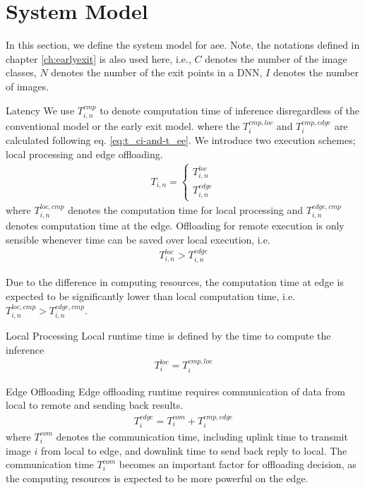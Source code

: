 \section{System Model} \label{sec:edge-system-model}
In this section, we define the system model for \gls{aee}. Note, the notations defined in chapter \ref{ch:earlyexit} is also used here, i.e., $ C $ denotes the number of the image classes, $ N $ denotes the number of the exit points in a DNN, $ I $ denotes the number of images. 	
\begin{enumdescript}
	\item[Latency]  We use $ T_{i,n}^{cmp} $ to denote computation time of inference disregardless of the conventional model or the early exit model. 
	where the $ T_i^{cmp,loc} $ and $ T_i^{cmp,edge} $ are calculated following eq. \ref{eq:t_ci-and-t_ee}.
	We introduce two execution schemes; local processing and edge offloading.
	\begin{align}
	T_{i,n} = \begin{cases}
	T_{i,n}^{loc} \\
	T_{i,n}^{edge}
	\end{cases}
	\end{align}
	where $ T_{i,n}^{loc,cmp} $ denotes the computation time for local processing  and $ T_{i,n}^{edge,cmp} $ denotes computation time at the edge. 
	Offloading for remote execution is only sensible whenever time can be saved over local execution, i.e.
	\begin{align*}
	T_{i,n}^{loc} > T_{i,n}^{edge}
	\end{align*}
	
	
	Due to the difference in computing resources, the computation time at edge is expected to be significantly lower than local computation time, i.e. $ T_{i,n}^{loc,cmp} > T_{i,n}^{edge,cmp} $. 
	
	
	\begin{enumdescript}
		\item[Local Processing] Local runtime time is defined by the time to compute the inference
		\begin{align}
		T_{i}^{loc}= T_{i}^{cmp,loc}
		\end{align}
		\item[Edge Offloading] Edge offloading runtime requires communication of data from local to remote and sending back results.
		\begin{align}
		T_{i}^{edge}=T_{i}^{com}+ T_{i}^{cmp,edge}
		\end{align}
		where $ T^{com}_i $ denotes the communication time, including uplink time to transmit image $ i $ from local to edge, and downlink time to send back reply to local. The communication time $ T^{com}_i $ becomes an important factor for offloading decision, as the computing resources is expected to be more powerful on the edge.			
		

\end{enumdescript}
\end{enumdescript}
